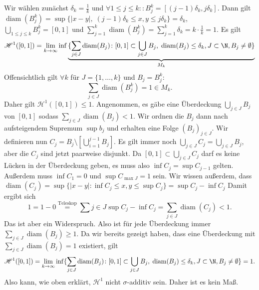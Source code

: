 \documentclass{article}
\newcommand{\diam}{\operatorname{diam}}
\begin{document}
\begin{enumerate}[(a)]
        Wir wählen zunächst $\delta_k = \frac{1}{k}$ und $\forall 1 \le j \le k\colon: B_j^k = [(j-1)\delta_k, j\delta_k]$. Dann gilt $\diam(B_j^k) = \sup \{|x - y|,\; (j-1)\delta_k \leq x,y\leq j\delta_k\} = \delta_k$, $\bigcup_{1\le j \le k} B_j^k = [0,1]$ und
        $\sum_{j = 1}^{k} \diam(B_j^k) = \sum_{j = 1}^{k} \delta_k = k\cdot \frac{1}{k} = 1$. Es gilt
        \[
            \mathscr H^1([0,1]) = \lim\limits_{k \to \infty} \inf \underbrace{\{\sum_{j \in J} \diam(B_j)\colon [0,1] \subset \bigcup_{j\in J} B_j,\;\diam(B_j) \leq \delta_k, J\subset \N, B_j \neq \emptyset\}}_{M_k}
        \]
        Offensichtlich gilt $\forall k$ für $J = \{1,\dots, k\}$ und $B_j = B_j^k$: \[\sum_{j \in J} \diam(B_j^k) = 1 \in M_k.\] Daher gilt $\mathscr H^1([0,1]) \leq 1$. Angenommen, es gäbe eine Überdeckung $\bigcup_{j\in J} B_j$ von $[0,1]$ sodass $\sum_{j\in J} \diam(B_j) < 1$. Wir ordnen die $B_j$ dann nach aufsteigendem Supremum $\sup b_j$ und erhalten eine Folge $(B_j)_{j\in J}$. Wir definieren nun $C_j = B_j \setminus \left[\bigcup_{i=1}^{j-1} B_j\right]$. Es gilt immer noch $\bigcup_{j\in J} C_j = \bigcup_{j\in J} B_j$, aber die $C_j$ sind jetzt paarweise disjunkt. Da $[0,1] \subset \bigcup_{j\in J} C_j$ darf es keine Lücken in der Überdeckung geben, es muss also $\inf C_j = \sup C_{j-1}$ gelten. Außerdem muss $\inf C_1 = 0$ und $\sup C_{\max J} = 1$ sein.
        Wir wissen außerdem, dass $\diam(C_j) = \sup \{|x - y| \colon \inf C_j \leq x,y \leq \sup C_j\} = \sup C_j - \inf C_j$ Damit ergibt sich
        \[
            1 = 1 - 0 \overset{\text{Teleskop}}{=} \sum{j\in J} \sup C_j - \inf C_j = \sum_{j\in J}\diam(C_j) < 1.
        \]
        Das ist aber ein Widerspruch. Also ist für jede Überdeckung immer $\sum_{j\in J} \diam(B_j) \geq 1$. Da wir bereits gezeigt haben, dass eine Überdeckung mit $\sum_{j\in J} \diam(B_j) = 1$ existiert, gilt 
        \[
            \mathscr H^1([0,1]) = \lim\limits_{k \to \infty} \inf \{\sum_{j \in J} \diam(B_j)\colon [0,1] \subset \bigcup_{j\in J} B_j,\;\diam(B_j) \leq \delta_k, J\subset \N, B_j \neq \emptyset\} = 1.
        \]
        Also kann, wie oben erklärt, $\mathscr H^1$ nicht $\sigma$-additiv sein. Daher ist es kein Maß.
    \end{enumerate}
\end{document}
